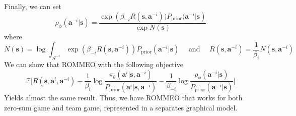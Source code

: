 Finally, we can set 
\begin{equation}
    \rho_{\phi}(\boldsymbol{a}^{-i} | \boldsymbol{s}) = \frac{\exp\left(\beta_{-i} R(\boldsymbol{s}, \boldsymbol{a}^{-i})) P_{\text{prior}}(\boldsymbol{a}^{-i} | \boldsymbol{s}\right)}{\exp N(\boldsymbol{s})}
\end{equation}
where 
\begin{equation}
    N(\boldsymbol{s}) = \log \int_{\mathcal{A}^{-i}} \exp(\beta_{-i} R(\boldsymbol{s}, \boldsymbol{a}^{-i})) P_{\text{prior}}(\boldsymbol{a}^{-i} | \boldsymbol{s}) \quad \text{ and } \quad  R(\boldsymbol{s}, \boldsymbol{a}^{-i}) = \frac{1}{\beta_{i}}N(\boldsymbol{s}, \boldsymbol{a}^{-i})
\end{equation}
We can show that ROMMEO with the following objective 
\begin{equation}
    \mathbb{E}\Bigg[ R(\boldsymbol{s}, \boldsymbol{a}^i, \boldsymbol{a}^{-i}) - \frac{1}{\beta_i} \log \frac{\pi_{\theta}(\boldsymbol{a}^i | \boldsymbol{s}, \boldsymbol{a}^{-i})}{P_{\text{prior}}(\boldsymbol{a}^i | \boldsymbol{s}, \boldsymbol{a}^{-i})} - \frac{1}{\beta_{-i}} \log \frac{\rho_{\phi}(\boldsymbol{a}^{-i} | \boldsymbol{s})}{P_{\text{prior}}(\boldsymbol{a}^{-i} | \boldsymbol{s})}  \Bigg]
\end{equation}
Yields almost the same result. Thus, we have ROMMEO that works for both zero-sum game and team game, represented in a separates graphical model. 


